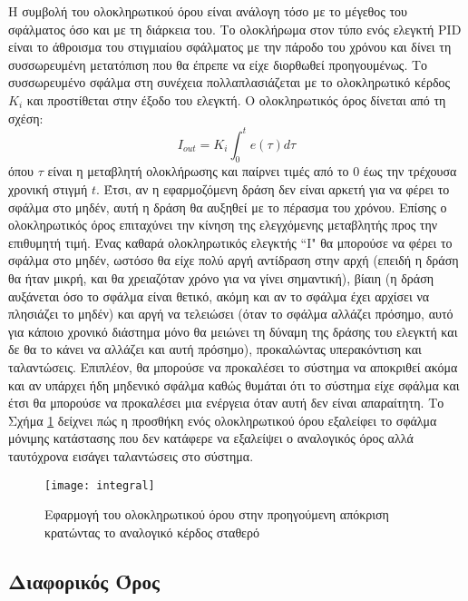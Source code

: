 Η συμβολή του ολοκληρωτικού όρου είναι ανάλογη τόσο με το μέγεθος του σφάλματος όσο και με τη διάρκεια του. Το ολοκλήρωμα στον τύπο ενός ελεγκτή PID είναι το άθροισμα του στιγμιαίου σφάλματος με την πάροδο του χρόνου και δίνει τη συσσωρευμένη μετατόπιση που θα έπρεπε να είχε διορθωθεί προηγουμένως. Το συσσωρευμένο σφάλμα στη συνέχεια πολλαπλασιάζεται με το ολοκληρωτικό κέρδος $K_i$ και προστίθεται στην έξοδο του ελεγκτή. Ο ολοκληρωτικός όρος δίνεται από τη σχέση:
\begin{equation}
I_{out}=K_i \int_{0}^{t} e(\tau)d\tau
\label{eq:i_out}
\end{equation}
όπου $\tau$ είναι η μεταβλητή ολοκλήρωσης και παίρνει τιμές από το $0$ έως την τρέχουσα χρονική στιγμή $t$. Έτσι, αν η εφαρμοζόμενη δράση δεν είναι αρκετή για να φέρει το σφάλμα στο μηδέν, αυτή η δράση θα αυξηθεί με το πέρασμα του χρόνου. Επίσης ο ολοκληρωτικός όρος επιταχύνει την κίνηση της ελεγχόμενης μεταβλητής προς την επιθυμητή τιμή. Ένας καθαρά ολοκληρωτικός ελεγκτής ``I" θα μπορούσε να φέρει το σφάλμα στο μηδέν, ωστόσο θα είχε πολύ αργή αντίδραση στην αρχή (επειδή η δράση θα ήταν μικρή, και θα χρειαζόταν χρόνο για να γίνει σημαντική), βίαιη (η δράση αυξάνεται όσο το σφάλμα είναι θετικό, ακόμη και αν το σφάλμα έχει αρχίσει να πλησιάζει το μηδέν) και αργή να τελειώσει (όταν το σφάλμα αλλάζει πρόσημο, αυτό για κάποιο χρονικό διάστημα μόνο θα μειώνει τη δύναμη της δράσης του ελεγκτή και δε θα το κάνει να αλλάζει και αυτή πρόσημο), προκαλώντας υπερακόντιση και ταλαντώσεις. Επιπλέον, θα μπορούσε να προκαλέσει το σύστημα να αποκριθεί ακόμα και αν υπάρχει ήδη μηδενικό σφάλμα καθώς θυμάται ότι το σύστημα είχε σφάλμα και έτσι θα μπορούσε να προκαλέσει μια ενέργεια όταν αυτή δεν είναι απαραίτητη. Το Σχήμα \ref{fig:integral} δείχνει πώς η προσθήκη ενός ολοκληρωτικού όρου εξαλείφει το σφάλμα μόνιμης κατάστασης που δεν κατάφερε να εξαλείψει ο αναλογικός όρος αλλά ταυτόχρονα εισάγει ταλαντώσεις στο σύστημα.

\begin{figure}[h]
  \centering
  \texttt{[image: integral]}
  \caption{Εφαρμογή του ολοκληρωτικού όρου στην προηγούμενη απόκριση κρατώντας το αναλογικό κέρδος σταθερό}
  \label{fig:integral}
\end{figure}

\subsection{Διαφορικός Όρος}


